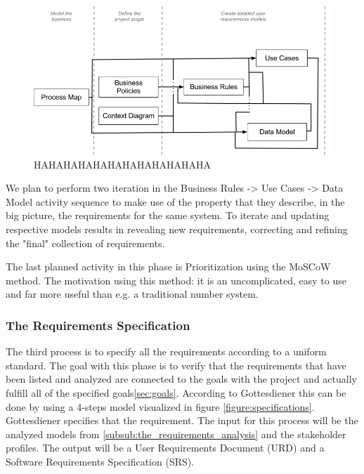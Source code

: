 \documentclass[a4paper]{article}
\begin{document}
\begin{figure}[H]
	\centering
		\includegraphics[width=1\textwidth]{images/model_the_business.png}
	\caption{HAHAHAHAHAHAHAHAHAHAHAHA}
	\label{figure:business}
\end{figure}
     
We plan to perform two iteration in the Business Rules -> Use Cases -> Data Model activity sequence to make use of the property that they describe, in the big picture, the requirements for the same system. To iterate and updating respective models results in revealing new requirements, correcting and refining the "final" collection of requirements.

The last planned activity in this phase is Prioritization using the MoSCoW method. The motivation using this method: it is an uncomplicated, easy to use and far more useful than e.g. a traditional number system\cite{coleyconsulting}.

\subsubsection{The Requirements Specification}
\label{subsub:the_requirements_specification}

The third process is to specify all the requirements according to a uniform standard. The goal with this phase is to verify that the requirements that have been listed and analyzed are connected to the goals with the project and actually fulfill all of the specified goals\ref{sec:goals}. According to Gottesdiener\cite{gott232} this can be done by using a 4-steps model visualized in figure \ref{figure:specifications}. Gottesdiener specifies that the requirement. The input for this process will be the analyzed models from \ref{subsub:the_requirements_analysis} and the stakeholder profiles. The output will be a User Requirements Document (URD) and a Software Requirements Specification (SRS).
\end{document}
